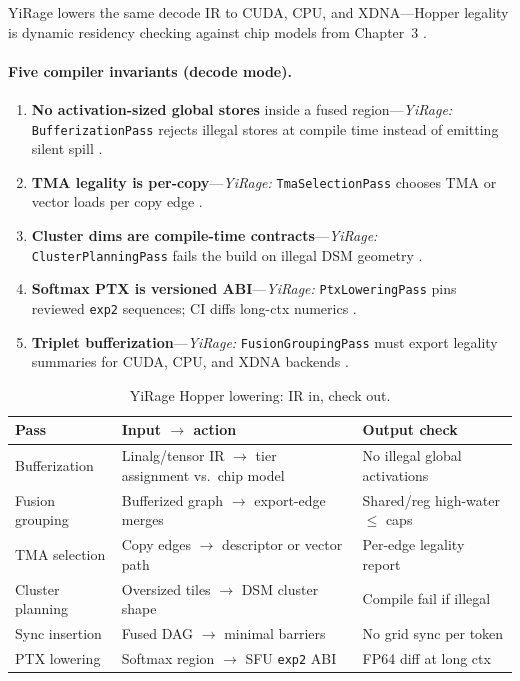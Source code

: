 YiRage lowers the same decode IR to CUDA, CPU, and XDNA---Hopper legality is dynamic residency checking against chip models from Chapter~3 \citep{yirage2026,chen2020compilerbasedhardw,amd2024xdna}.

\paragraph{Five compiler invariants (decode mode).}
\begin{enumerate}
\item \textbf{No activation-sized global stores} inside a fused region---\emph{YiRage:} \texttt{BufferizationPass} rejects illegal stores at compile time instead of emitting silent spill \citep{memoryfloor2026,yirage2026}.
\item \textbf{TMA legality is per-copy}---\emph{YiRage:} \texttt{TmaSelectionPass} chooses TMA or vector loads per copy edge \citep{semianalysis2024tma,taxbreak2026}.
\item \textbf{Cluster dims are compile-time contracts}---\emph{YiRage:} \texttt{ClusterPlanningPass} fails the build on illegal DSM geometry \citep{nvidia2022hopper,yirage2026}.
\item \textbf{Softmax PTX is versioned ABI}---\emph{YiRage:} \texttt{PtxLoweringPass} pins reviewed \texttt{exp2} sequences; CI diffs long-ctx numerics \citep{dao2022flashattention,liu2024deepseekv3}.
\item \textbf{Triplet bufferization}---\emph{YiRage:} \texttt{FusionGroupingPass} must export legality summaries for CUDA, CPU, and XDNA backends \citep{amd2024aie,patel2025llminference}.
\end{enumerate}

\begin{table}[t]
\centering
\small
\caption{YiRage Hopper lowering: IR in, check out.}
\label{tab:yirage_lowering}
\begin{tabular}{@{}p{2.1cm}p{3.2cm}p{3.8cm}@{}}
\toprule
\textbf{Pass} & \textbf{Input $\rightarrow$ action} & \textbf{Output check} \\
\midrule
Bufferization & Linalg/tensor IR $\rightarrow$ tier assignment vs.\ chip model & No illegal global activations \\
Fusion grouping & Bufferized graph $\rightarrow$ export-edge merges & Shared/reg high-water $\le$ caps \\
TMA selection & Copy edges $\rightarrow$ descriptor or vector path & Per-edge legality report \\
Cluster planning & Oversized tiles $\rightarrow$ DSM cluster shape & Compile fail if illegal \\
Sync insertion & Fused DAG $\rightarrow$ minimal barriers & No grid sync per token \\
PTX lowering & Softmax region $\rightarrow$ SFU \texttt{exp2} ABI & FP64 diff at long ctx \\
\bottomrule
\end{tabular}
\end{table}

